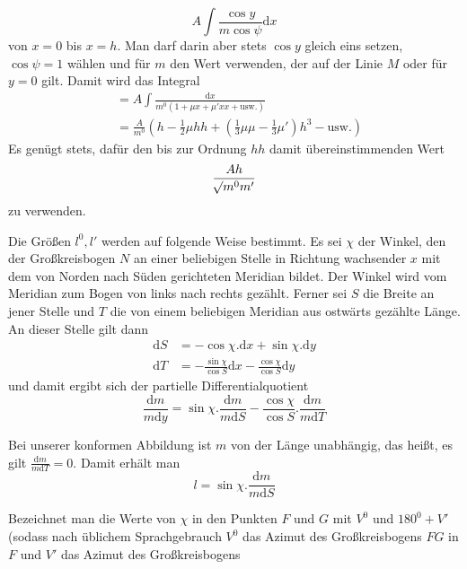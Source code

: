 %
\[
A\int\frac{\cos y}{m\cos\psi}\mathrm{d}x
\]
von \(x=0\) bis \(x=h\). Man darf darin aber stets \(\cos y\) gleich eins setzen, \(\cos\psi=1\) wählen und für \(m\) den Wert verwenden, der auf der Linie \(M\) oder für \(y=0\) gilt. Damit wird das Integral
\[
\begin{aligned}
&=A\int\frac{\mathrm{d}x}{m^0(1+\mu x+\mu'xx+\text{usw.})}\\
&=\frac{A}{m^0}(h-\tfrac{1}{2}\mu hh+(\tfrac{1}{3}\mu\mu-\tfrac{1}{3}\mu')h^3-\text{usw.})
\end{aligned}
\]
Es genügt stets, dafür den bis zur Ordnung \(hh\) damit übereinstimmenden Wert
\[
\frac{Ah}{\mathord{{}^{}\!\surd}m^0m'}
\]
zu verwenden.

Die Größen \(l^0,l'\) werden auf folgende Weise bestimmt. Es sei \(\chi\) der Winkel, den der Großkreisbogen \(N\) an einer beliebigen Stelle in Richtung wachsender \(x\) mit dem von Norden nach Süden gerichteten Meridian bildet. Der Winkel wird vom Meridian zum Bogen von links nach rechts gezählt. Ferner sei \(S\) die Breite an jener Stelle und \(T\) die von einem beliebigen Meridian aus ostwärts gezählte Länge. An dieser Stelle gilt dann
\[
\begin{aligned}
\mathrm{d}S&=-\cos\chi\mathord{.}\mathrm{d}x+\sin\chi\mathord{.}\mathrm{d}y\\
\mathrm{d}T&=-\frac{\sin\chi}{\cos S}\mathrm{d}x-\frac{\cos\chi}{\cos S}\mathrm{d}y
\end{aligned}
\]
und damit ergibt sich der partielle Differentialquotient
\[
\frac{\mathrm{d}m}{m\mathrm{d}y}=\sin\chi\mathord{.}\frac{\mathrm{d}m}{m\mathrm{d}S}-\frac{\cos\chi}{\cos S}\mathord{.}\frac{\mathrm{d}m}{m\mathrm{d}T}
\]

Bei unserer konformen Abbildung ist \(m\) von der Länge unabhängig, das heißt, es gilt \(\tfrac{\mathrm{d}m}{m\mathrm{d}T}=0\). Damit erhält man
\[
l=\sin\chi\mathord{.}\frac{\mathrm{d}m}{m\mathrm{d}S}
\]

Bezeichnet man die Werte von \(\chi\) in den Punkten \(F\) und \(G\) mit \(V^0\) und \(180^0+V'\) (sodass nach üblichem Sprachgebrauch \(V^0\) das Azimut des Großkreisbogens \(FG\) in \(F\) und \(V'\) das Azimut des Großkreisbogens
